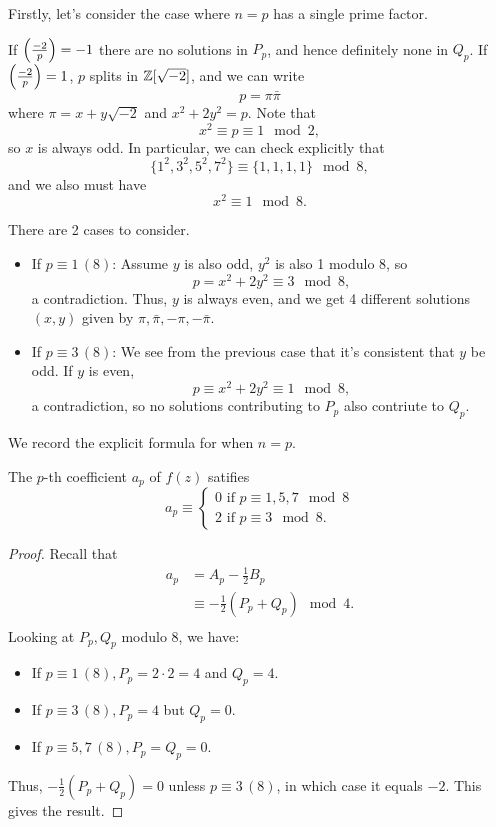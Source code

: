 \documentclass[12pt, a4paper]{amsart}
\begin{document}
Firstly, let's consider the case where $n = p$ has a single prime factor.

If $\left(\frac{-2}{p}\right) = -1$ there are no solutions in $P_p$, and hence definitely
none in $Q_p$.
If $\left(\frac{-2}{p}\right) = 1$, $p$ splits in ${\mathbb Z}[\sqrt{-2}]$, and we can write
\[p = \pi \bar{\pi}\]
where $\pi = x + y\sqrt{-2}$ and $x^2 + 2y^2 = p$.
Note that
\[x^2 \equiv p \equiv 1 \mod{2},\]
so $x$ is always odd. In particular, we can check explicitly that
\[\{1^2,3^2,5^2,7^2\} \equiv \{1,1,1,1\} \mod{8},\]
and we also must have
\[x^2 \equiv 1 \mod{8}.\]

There are 2 cases to consider.

\begin{itemize}
\item If $p \equiv 1 \, (8)$:
  Assume $y$ is also odd, $y^2$ is also 1 modulo 8, so
  \[p = x^2 + 2y^2 \equiv 3 \mod{8},\]
  a contradiction.
  Thus, $y$ is always even, and we get 4 different solutions $(x,y)$ given by
  $\pi, \bar{\pi}, -\pi, -\bar{\pi}$.

\item If $p \equiv 3 \, (8)$:
  We see from the previous case that it's consistent that $y$ be odd.
  If $y$ is even,
  \[p \equiv x^2 + 2y^2 \equiv 1 \mod{8},\]
  a contradiction, so no solutions contributing to $P_p$ also contriute to $Q_p$.
\end{itemize}

We record the explicit formula for when $n = p$.

\begin{cor}
  The $p$-th coefficient $a_p$ of $f(z)$ satifies
  \[a_p \equiv \begin{cases}
      0 \text{ if } p \equiv 1,5,7 \mod{8} \\
      2 \text{ if } p \equiv 3 \mod{8}.
    \end{cases}\]
\end{cor}
\begin{proof}
  Recall that
  \[
    \begin{split}
      a_p &= A_p - \frac{1}{2}B_p \\
      &\equiv -\frac{1}{2}(P_p + Q_p) \mod{4}. \\
    \end{split}
  \]
  Looking at $P_p, Q_p$ modulo 8, we have:

  \begin{itemize}
  \item If $p \equiv 1 \, (8), P_p = 2\cdot 2 = 4$ and $Q_p = 4.$

  \item If $p \equiv 3 \, (8), P_p = 4$ but $Q_p = 0$.

  \item If $p \equiv 5, 7 \, (8), P_p = Q_p = 0$.
  \end{itemize}
  Thus, $-\frac{1}{2} (P_p + Q_p) = 0$ unless $p \equiv 3 \, (8)$, in which case
  it equals $-2$. This gives the result.
\end{proof}
\end{document}
